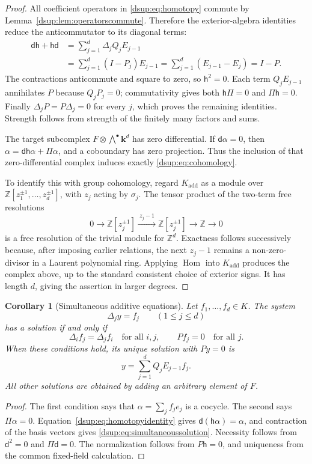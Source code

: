 \documentclass[11pt,oneside]{article}
\numberwithin{equation}{section}
\newtheorem{corollary}[theorem]{Corollary}
\theoremstyle{definition}
\theoremstyle{remark}
\newcommand{\Z}{\mathbb Z}
\newcommand{\kk}{\mathbf k}
\newcommand{\dd}{\mathsf d}
\newcommand{\hh}{\mathsf h}
\begin{document}
\begin{proof}
All coefficient operators in \eqref{dsup:eq:homotopy} commute by
Lemma~\ref{dsup:lem:operatorscommute}. Therefore the exterior-algebra identities
reduce the anticommutator to its diagonal terms:
\begin{align*}
 \dd\hh+\hh\dd
 &=\sum_{j=1}^d\Delta_jQ_jE_{j-1}\\
 &=\sum_{j=1}^d(I-P_j)E_{j-1}
   =\sum_{j=1}^d(E_{j-1}-E_j)=I-P.
\end{align*}
The contractions anticommute and square to zero, so $\hh^2=0$. Each term
$Q_jE_{j-1}$ annihilates $P$ because $Q_jP_j=0$; commutativity gives both
$\hh\Pi=0$ and $\Pi\hh=0$. Finally $\Delta_jP=P\Delta_j=0$ for every $j$,
which proves the remaining identities. Strength follows from strength of
the finitely many factors and sums.

The target subcomplex $F\otimes\bigwedge^\bullet\kk^d$ has zero
differential. If $\dd\alpha=0$, then
$\alpha=\dd\hh\alpha+\Pi\alpha$, and a coboundary has zero projection.
Thus the inclusion of that zero-differential complex induces exactly
\eqref{dsup:eq:cohomology}.

To identify this with group cohomology, regard $K_{\mathrm{add}}$ as a
module over $\Z[z_1^{\pm1},\ldots,z_d^{\pm1}]$, with $z_j$ acting by
$\sigma_j$. The tensor product of the two-term free resolutions
\[
 0\longrightarrow\Z[z_j^{\pm1}]
   \xrightarrow{\ z_j-1\ }\Z[z_j^{\pm1}]
   \longrightarrow\Z\longrightarrow0
\]
is a free resolution of the trivial module for $\Z^d$. Exactness follows
successively because, after imposing earlier relations, the next
$z_j-1$ remains a non-zero-divisor in a Laurent polynomial ring.
Applying $\operatorname{Hom}$ into $K_{\mathrm{add}}$ produces the complex
above, up to the standard consistent choice of exterior signs. It has
length $d$, giving the assertion in larger degrees.
\end{proof}

\begin{corollary}[Simultaneous additive equations]\label{dsup:cor:simultaneous}
Let $f_1,\ldots,f_d\in K$. The system
\[
 \Delta_jy=f_j\qquad(1\le j\le d)
\]
has a solution if and only if
\begin{equation}\label{dsup:eq:additivecriteria}
 \Delta_i f_j=\Delta_jf_i\quad\text{for all }i,j,
 \qquad Pf_j=0\quad\text{for all }j.
\end{equation}
When these conditions hold, its unique solution with $Py=0$ is
\begin{equation}\label{dsup:eq:simultaneoussolution}
 y=\sum_{j=1}^d Q_jE_{j-1}f_j.
\end{equation}
All other solutions are obtained by adding an arbitrary element of $F$.
\end{corollary}
\begin{proof}
The first condition says that $\alpha=\sum_j f_je_j$ is a cocycle. The
second says $\Pi\alpha=0$. Equation~\eqref{dsup:eq:homotopyidentity} gives
$\dd(\hh\alpha)=\alpha$, and contraction of the basis vectors gives
\eqref{dsup:eq:simultaneoussolution}. Necessity follows from
$\dd^2=0$ and $\Pi\dd=0$. The normalization follows from $P\hh=0$, and
uniqueness from the common fixed-field calculation.
\end{proof}
\end{document}
